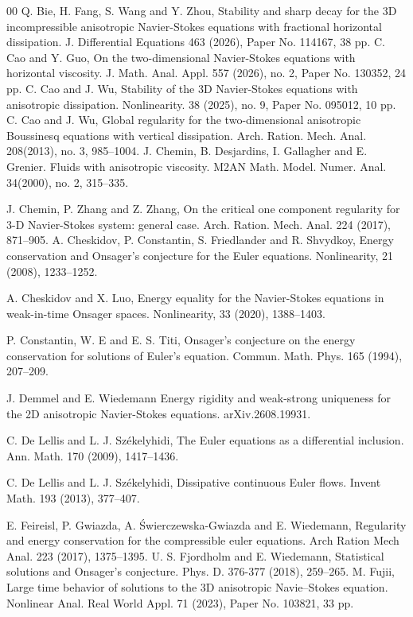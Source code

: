 \documentclass[11pt]{article}
\theoremstyle{plain}\newtheorem{definition}{Definition}[section]
\theoremstyle{definition}\newtheorem{theorem}{Theorem}[section]
\theoremstyle{plain}\newtheorem{lemma}[theorem]{Lemma}
\theoremstyle{plain}\newtheorem{coro}[theorem]{Corollary}
\theoremstyle{plain}\newtheorem{prop}[theorem]{Proposition}
\theoremstyle{remark}\newtheorem{remark}{Remark}[section]
\numberwithin{equation}{section}
\begin{document}
\begin{thebibliography}{00}
\bibitem{[BFWZ]}
Q. Bie, H. Fang, S. Wang and Y. Zhou, Stability and sharp decay for the 3D incompressible anisotropic Navier-Stokes equations with fractional horizontal dissipation. J. Differential Equations 463 (2026), Paper No. 114167, 38 pp.
\bibitem{[CG]}
C. Cao and Y. Guo, On the two-dimensional Navier-Stokes equations with horizontal viscosity.
J. Math. Anal. Appl. 557 (2026), no. 2, Paper No. 130352, 24 pp.
\bibitem{[CW1]}
C. Cao and J. Wu, Stability of the 3D Navier-Stokes equations with anisotropic dissipation. Nonlinearity. 38 (2025), no. 9, Paper No. 095012, 10 pp.
\bibitem{[CW]}
C. Cao and J. Wu, Global regularity for the two-dimensional anisotropic Boussinesq equations with vertical dissipation.
Arch. Ration. Mech. Anal.  208(2013), no. 3, 985--1004.
\bibitem{[CDGG]} J. Chemin, B. Desjardins, I. Gallagher and E. Grenier. Fluids with anisotropic viscosity. M2AN Math.
Model. Numer. Anal. 34(2000), no. 2, 315--335.



\bibitem{[CZZ]}
J. Chemin, P. Zhang and Z. Zhang, On the critical one component regularity for 3-D
Navier-Stokes system: general case. Arch. Ration. Mech. Anal. 224 (2017), 871--905.
\bibitem{[CCFS]}
A. Cheskidov,  P. Constantin, S. Friedlander and R. Shvydkoy, Energy conservation and Onsager's conjecture for the Euler equations. Nonlinearity, 21 (2008), 1233--1252.



\bibitem{[CL]}
   A. Cheskidov and X. Luo, Energy equality for the Navier-Stokes equations in weak-in-time Onsager spaces. Nonlinearity, 33 (2020), 1388--1403.

\bibitem{[CET]} P. Constantin,  W. E and   E. S. Titi,  Onsager's conjecture on the energy conservation for solutions of Euler's equation. Commun. Math. Phys. 165 (1994), 207--209.


\bibitem{[DW]}
J. Demmel and E. Wiedemann
Energy rigidity and weak-strong uniqueness for the 2D anisotropic Navier-Stokes equations.
 arXiv.2608.19931.

\bibitem{[DS0]}
C. De Lellis and  L.  J.  Sz\'ekelyhidi,
The Euler equations as a differential inclusion.
Ann. Math. 170 (2009), 1417--1436.

\bibitem{[DS1]}
C. De Lellis and  L.  J.  Sz\'ekelyhidi,   Dissipative continuous Euler flows. Invent Math. 193 (2013), 377--407.

\bibitem{[FGSW]}
E. Feireisl, P. Gwiazda, A. \'Swierczewska-Gwiazda and E. Wiedemann, Regularity and
energy conservation for the compressible euler equations. Arch Ration Mech Anal. 223
(2017), 1375--1395.
\bibitem{[FW2018]}
U. S. Fjordholm and E.  Wiedemann,  Statistical solutions and Onsager's conjecture.
Phys. D.      376-377 (2018), 259--265.
 \bibitem{[F]}
M. Fujii, Large time behavior of solutions to the 3D anisotropic Navie--Stokes equation. Nonlinear Anal. Real World Appl. 71 (2023), Paper No. 103821, 33 pp.



\end{thebibliography}
\end{document}
